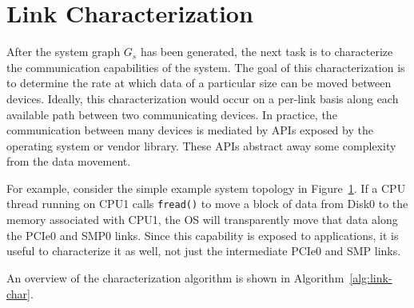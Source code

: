 %
%
\section{Link Characterization}
\label{sec:link-char}

After the system graph $G_s$ has been generated, the next task is to characterize the communication capabilities of the system.
The goal of this characterization is to determine the rate at which data of a particular size can be moved between devices.
Ideally, this characterization would occur on a per-link basis along each available path between two communicating devices.
In practice, the communication between many devices is mediated by APIs exposed by the operating system or vendor library.
These APIs abstract away some complexity from the data movement.

\begin{figure}
    \centering
    \caption[A simple example topology]{}
    \label{fig:simple-topology}
\end{figure}

For example, consider the simple example system topology in Figure~\ref{fig:simple-topology}.
If a CPU thread running on CPU1 calls \texttt{fread()} to move a block of data from Disk0 to the memory associated with CPU1, the OS will transparently move that data along the PCIe0 and SMP0 links.
Since this capability is exposed to applications, it is useful to characterize it as well, not just the intermediate PCIe0 and SMP links.

An overview of the characterization algorithm is shown in Algorithm~\ref{alg:link-char}.

